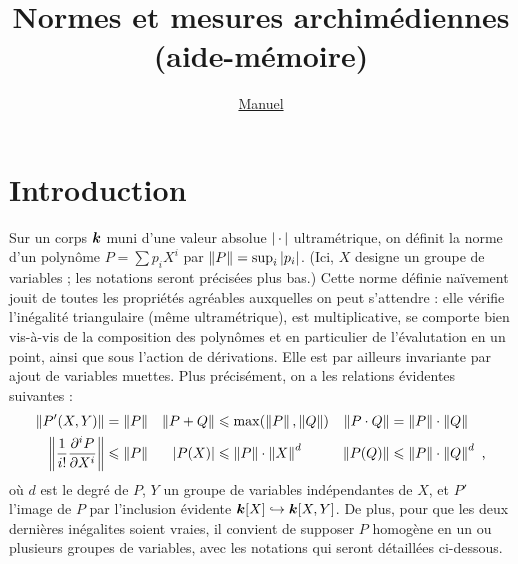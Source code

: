 
\usepackage[colorlinks=true, urlcolor=black, linkcolor=black,
	 bookmarks=true, bookmarksnumbered=true, bookmarksopen=true]{hyperref}

% 
\newcommand*\lgr[1]{\abs{#1}} %
\newcommand*\vlg[1]{\abs{#1}} %
\newcommand*\der[1]{\partial_{#1}} %
\newcommand*\ncoef[1]{\mathcal N(#1)} %
\newcommand*\maxbin[1]{m(#1)} %


%
\newcommand*\normsup[1]{\norm{#1}_\infty}
\newcommand*\normlun[1]{\norm{#1}_1}
\newcommand*\normeuc[1]{\norm{#1}_2}
\newcommand*\normhom[1]{\norm{#1}_{\mathrm h}}
\newcommand*\mespph[1]{\mathrm{M}(#1)}
\newcommand*\mahler[1]{\mathcal{M}(#1)}

\author{\href{http://math.jussieu.fr/~mpg/}{Manuel }}
\title{Normes et mesures archimédiennes \\ (aide-mémoire)}



\maketitle

\section*{Introduction}

Sur un corps $\boldsymbol{k}$ muni d'une valeur absolue $\left\lvert{\,\cdot\,}\right\rvert$ ultramétrique, on
définit la norme d'un polynôme $P = \sum p_i X^i$ par $\left\lVert P\right\rVert = \sup_i
\left\lvert p_i\right\rvert$. (Ici, $X$ designe un groupe de variables ; les notations seront
précisées plus bas.) Cette norme définie naïvement jouit de toutes les
propriétés agréables auxquelles on peut s'attendre : elle vérifie l'inégalité
triangulaire (même ultramétrique), est multiplicative, se comporte bien
vis-à-vis de la composition des polynômes et en particulier de l'évalutation
en un point, ainsi que sous l'action de dérivations. Elle est par ailleurs
invariante par ajout de variables muettes. Plus précisément, on a les
relations évidentes suivantes :
\begin{align*}
  \left\lVert P'(X, Y)\right\rVert 
  & = \left\lVert P\right\rVert 	
  & 
  \left\lVert P+Q\right\rVert 
  & \leqslant \max (\left\lVert P\right\rVert, \left\lVert Q\right\rVert)	
  &
  \left\lVert P\cdot Q\right\rVert 
  & = \left\lVert P\right\rVert \cdot \left\lVert Q\right\rVert
  \\
  \left\lVert \frac{1}{i!} \frac {\partial^i P} {\partial X^i} \right\rVert 
  & \leqslant \left\lVert P\right\rVert 
  & 
  \left\lvert P(X)\right\rvert 
  & \leqslant \left\lVert P\right\rVert \cdot \left\lVert X\right\rVert^d 	
  & 
  \left\lVert P(Q)\right\rVert 
  & \leqslant \left\lVert P\right\rVert \cdot \left\lVert Q\right\rVert^d
  \text{ ,}
\end{align*}
où $d$ est le degré de $P$, $Y$ un groupe de variables indépendantes de $X$,
et $P'$ l'image de $P$ par l'inclusion évidente $\boldsymbol{k}[X] \hookrightarrow
\boldsymbol{k}[X, Y]$. De plus, pour que les deux dernières inégalites soient vraies, il
convient de supposer $P$ homogène en un ou plusieurs groupes de variables,
avec les notations qui seront détaillées ci-dessous.

